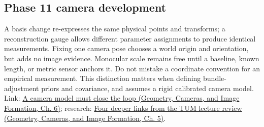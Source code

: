 \subsection{Phase 11 camera development}\label{appendix-1bae9457dbc3-phase-11-camera-development}

A basis change re-expresses the same physical points and transforms; a reconstruction gauge allows different parameter assignments to produce identical measurements. Fixing one camera pose chooses a world origin and orientation, but adds no image evidence. Monocular scale remains free until a baseline, known length, or metric sensor anchors it. Do not mistake a coordinate convention for an empirical measurement. This distinction matters when defining bundle-adjustment priors and covariance, and assumes a rigid calibrated camera model. Link: \href{../03-Geometry-Cameras-and-Image-Formation/main.pdf\#nameddest=02-foundations-ii-ch037-a-camera-model-must-close-the-loop}{A camera model must close the loop (Geometry, Cameras, and Image Formation, Ch. 6)}; research: \href{../03-Geometry-Cameras-and-Image-Formation/main.pdf\#nameddest=02-foundations-ii-ch036-four-deeper-links-from-the-tum-lecture-review}{Four deeper links from the TUM lecture review (Geometry, Cameras, and Image Formation, Ch. 5)}.
